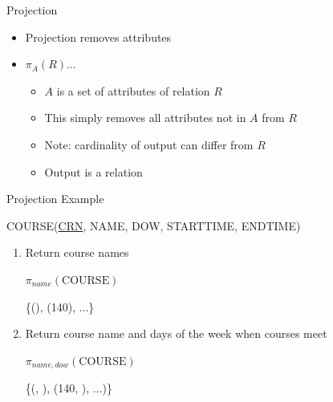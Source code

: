 \documentclass[aspectratio=169]{beamer}
\begin{document}
\begin{frame}{Projection}

\begin{itemize}
\item Projection removes attributes
\item $\pi_A (R)$...
	\begin{itemize}
	\item $A$ is a set of attributes of relation $R$
	\item This simply removes all attributes not in $A$ from $R$
	\item Note: cardinality of output can differ from $R$
	\item Output is a relation
	\end{itemize}
\end{itemize}
\end{frame}
\begin{frame}{Projection Example}

COURSE(\underline{CRN}, NAME, DOW, STARTTIME, ENDTIME)

\begin{enumerate}
\item Return course names

$\pi_{name}(\textrm{COURSE})$

\{(\textquotesingle), (140\textquotesingle), ...\}
\item Return course name and days of the week when courses meet

$\pi_{name, dow}(\textrm{COURSE})$

\{(\textquotesingle, \textquotesingle), (140\textquotesingle, \textquotesingle), ...)\}
\end{enumerate}
\end{frame}
\end{document}
